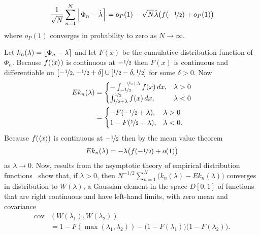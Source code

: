 \documentclass[journal]{IEEEtran}
\begin{document}
\begin{lemma}\label{lem:EI_n}
\[
\frac{1}{\sqrt{N}}\sum_{n=1}^{N} {\left\lfloor  \Phi_n - \hat{\lambda} \right\rceil} = o_P(1) - \sqrt{N}\hat{\lambda}\big( f(-\nicefrac{1}{2}) + o_P(1) \big)
\]
where $o_P(1)$ converges in probability to zero as $N\rightarrow\infty$.
\end{lemma}
\begin{IEEEproof}
Let $k_n(\lambda) = {\left\lfloor \Phi_n - \lambda \right\rceil}$ and let $F(x)$ be the cumulative distribution function of $\Phi_n$.  Because $f(\left< x \right>)$ is continuous at $-\nicefrac{1}{2}$ then $F(x)$ is continuous and differentiable on $[-\nicefrac{1}{2}, -\nicefrac{1}{2} + \delta] \cup [\nicefrac{1}{2} - \delta, \nicefrac{1}{2}]$ for some $\delta > 0$.  Now
\begin{align*}
E k_n(\lambda) &= \begin{cases}
-\int_{-\nicefrac{1}{2}}^{-\nicefrac{1}{2} + \lambda}f(x)\,dx, &  \lambda > 0 \\
\int_{\nicefrac{1}{2} + \lambda}^{\nicefrac{1}{2}}f(x)\,dx, &  \lambda < 0
\end{cases} \\
&= \begin{cases}
-F(-\nicefrac{1}{2} + \lambda), &  \lambda > 0 \\
1 - F(\nicefrac{1}{2} + \lambda), &  \lambda < 0.
\end{cases} 
\end{align*}
Because $f(\left< x \right>)$ is continuous at $-\nicefrac{1}{2}$ then by the mean value theorem
\[
E k_n(\lambda) = -\lambda \big( f(-\nicefrac{1}{2}) + o(1) \big)
\] 
as $\lambda \rightarrow 0$.  Now, results from the asymptotic theory of empirical distribution functions~\cite[Theorem 14.3, p. 149]{Billingsley1999_convergence_of_probability_measures} show that, if $\lambda > 0$, then $N^{-1/2} \sum_{n=1}^{N} \big( k_n(\lambda) - Ek_n(\lambda) \big)$ converges in distribution to $W(\lambda)$, a Gaussian element in the space $D[0,1]$ of functions that are right continuous and have left-hand limits, with zero mean and covariance
\begin{align*}
\operatorname{cov}&( W(\lambda_1), W(\lambda_2) ) \\
&= 1 - F( \max(\lambda_1, \lambda_2) ) - \big( 1 - F(\lambda_1)  \big) \big( 1 - F(\lambda_2)  \big).
\end{align*}


\end{IEEEproof}
\end{document}
